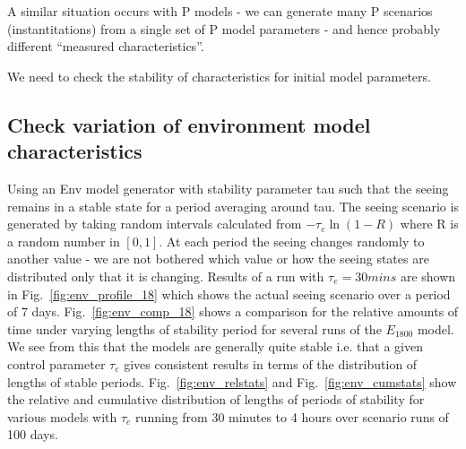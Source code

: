 A similar situation occurs with P models - we can generate many P scenarios (instantitations) from a single set of P model parameters - and hence probably different ``measured characteristics''.

We need to check the stability of characteristics for initial model parameters.

\subsection{Check variation of environment model characteristics}

Using an Env model generator with stability parameter tau such that the seeing remains in a stable state for a period averaging around tau. The seeing scenario is generated by taking random intervals calculated from $-\tau_e \ln{(1-R)}$ where R is a random number in $[0,1]$. At each period the seeing changes randomly to another value - we are not bothered which value or how the seeing states are distributed only that it is changing. Results of a run with $\tau_e =30 mins$ are shown in Fig.~\ref{fig:env_profile_18} which shows the actual seeing scenario over a period of 7 days. Fig.~\ref{fig:env_comp_18} shows a comparison for the relative amounts of time under varying lengths of stability period for several runs of the $E_{1800}$ model. We see from this that the models are generally quite stable i.e. that a given control parameter $\tau_e$ gives consistent results in terms of the distribution of lengths of stable periods. Fig.~\ref{fig:env_relstats} and  Fig.~\ref{fig:env_cumstats} show the relative and cumulative distribution of lengths of periods of stability for various models with $\tau_e$ running from 30 minutes to 4 hours over scenario runs of 100 days.

